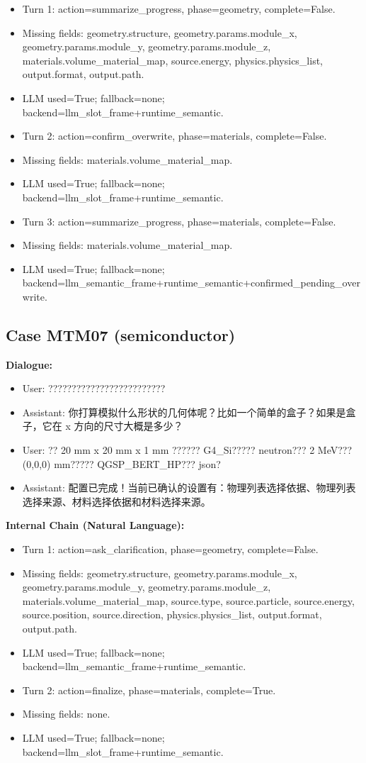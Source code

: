 \documentclass[11pt]{ctexart}
\begin{document}
\begin{itemize}
\item Turn 1: action=summarize\_progress, phase=geometry, complete=False.
\item Missing fields: geometry.structure, geometry.params.module\_x, geometry.params.module\_y, geometry.params.module\_z, materials.volume\_material\_map, source.energy, physics.physics\_list, output.format, output.path.
\item LLM used=True; fallback=none; backend=llm\_slot\_frame+runtime\_semantic.
\item Turn 2: action=confirm\_overwrite, phase=materials, complete=False.
\item Missing fields: materials.volume\_material\_map.
\item LLM used=True; fallback=none; backend=llm\_slot\_frame+runtime\_semantic.
\item Turn 3: action=summarize\_progress, phase=materials, complete=False.
\item Missing fields: materials.volume\_material\_map.
\item LLM used=True; fallback=none; backend=llm\_semantic\_frame+runtime\_semantic+confirmed\_pending\_overwrite.
\end{itemize}
\subsection{Case MTM07 (semiconductor)}
\textbf{Dialogue:}
\begin{itemize}
\item User: ?????????????????????????
\item Assistant: 你打算模拟什么形状的几何体呢？比如一个简单的盒子？如果是盒子，它在 x 方向的尺寸大概是多少？
\item User: ?? 20 mm x 20 mm x 1 mm ?????? G4\_Si????? neutron??? 2 MeV??? (0,0,0) mm????? QGSP\_BERT\_HP??? json?
\item Assistant: 配置已完成！当前已确认的设置有：物理列表选择依据、物理列表选择来源、材料选择依据和材料选择来源。
\end{itemize}
\textbf{Internal Chain (Natural Language):}
\begin{itemize}
\item Turn 1: action=ask\_clarification, phase=geometry, complete=False.
\item Missing fields: geometry.structure, geometry.params.module\_x, geometry.params.module\_y, geometry.params.module\_z, materials.volume\_material\_map, source.type, source.particle, source.energy, source.position, source.direction, physics.physics\_list, output.format, output.path.
\item LLM used=True; fallback=none; backend=llm\_semantic\_frame+runtime\_semantic.
\item Turn 2: action=finalize, phase=materials, complete=True.
\item Missing fields: none.
\item LLM used=True; fallback=none; backend=llm\_slot\_frame+runtime\_semantic.
\end{itemize}
\end{document}
